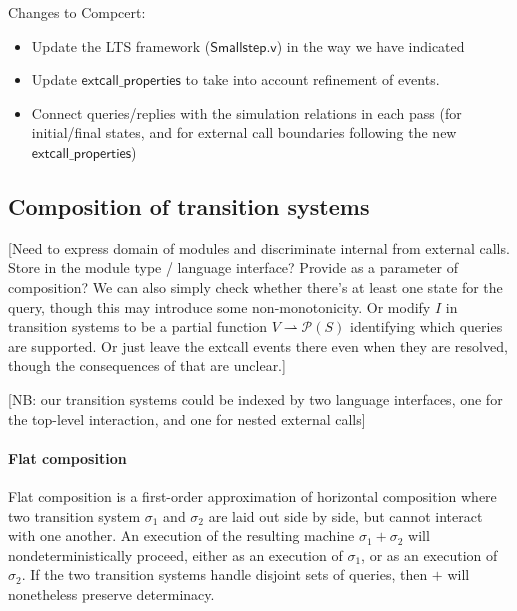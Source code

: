 \documentclass[acmsmall,10pt,review,anonymous]{acmart}
\newcommand{\kw}[1]{\ensuremath{ \textsf{#1} }}
\begin{document}
Changes to Compcert:
\begin{itemize}
\item Update the LTS framework (\kw{Smallstep.v})
  in the way we have indicated
\item Update \kw{extcall\_properties} to take into account
  refinement of events.
\item Connect queries/replies
  with the simulation relations in each pass
  (for initial/final states, and for external call boundaries
  following the new \kw{extcall\_properties})
\end{itemize}  


\subsection{Composition of transition systems} %

[Need to express domain of modules and discriminate
internal from external calls.
Store in the module type / language interface?
Provide as a parameter of composition?
We can also simply check whether there's at least
one state for the query,
though this may introduce some non-monotonicity.
Or modify $I$ in transition systems
to be a partial function $V \rightharpoonup \mathcal{P}(S)$
identifying which queries are supported.
Or just leave the extcall events there even when
they are resolved,
though the consequences of that are unclear.]

[NB: our transition systems could be indexed by two language interfaces,
one for the top-level interaction, and one for nested external calls]

\paragraph{Flat composition} %

Flat composition
is a first-order approximation of horizontal composition
where two transition system $\sigma_1$ and $\sigma_2$
are laid out side by side,
but cannot interact with one another.
An execution of the resulting machine $\sigma_1 + \sigma_2$
will nondeterministically proceed,
either as an execution of $\sigma_1$,
or as an execution of $\sigma_2$.
If the two transition systems
handle disjoint sets of queries,
then $+$ will nonetheless preserve determinacy.
\end{document}
